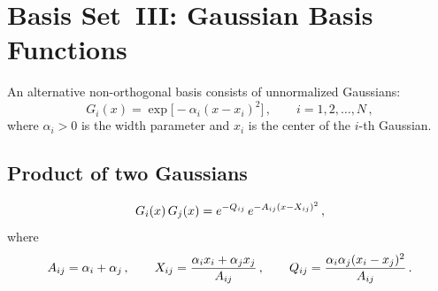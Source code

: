 \section{Basis Set~III: Gaussian Basis Functions}\label{sec:gaussian}

An alternative non-orthogonal basis consists of unnormalized Gaussians:
\begin{equation}\label{eq:Gaussian_def}
  G_i(x) = \exp\bigl[-\alpha_i(x - x_i)^2\bigr]\,,\qquad i = 1, 2, \ldots, N\,,
\end{equation}
where $\alpha_i > 0$ is the width parameter and $x_i$ is the center of the $i$-th Gaussian.

\subsection{Product of two Gaussians}\label{sec:Gauss_product}

\begin{result}
\begin{equation}\label{eq:Gauss_product}
  G_i(x)\,G_j(x) = e^{-Q_{ij}}\,e^{-A_{ij}(x - X_{ij})^2}\,,
\end{equation}
where
\begin{equation}\label{eq:AXQ}
  A_{ij} = \alpha_i + \alpha_j\,,\qquad
  X_{ij} = \frac{\alpha_i x_i + \alpha_j x_j}{A_{ij}}\,,\qquad
  Q_{ij} = \frac{\alpha_i\alpha_j(x_i - x_j)^2}{A_{ij}}\,.
\end{equation}
\end{result}

